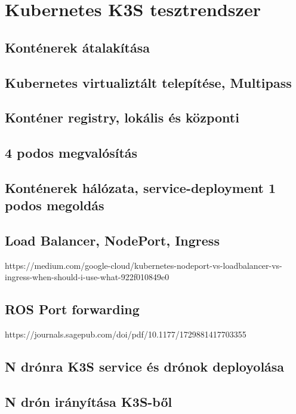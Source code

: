 
\chapter{Kubernetes K3S tesztrendszer}

\section{Konténerek átalakítása}

\section{Kubernetes virtualiztált telepítése, Multipass}

\section{Konténer registry, lokális és központi}

\section{4 podos megvalósítás}

\section{Konténerek hálózata, service-deployment 1 podos megoldás}

\section{Load Balancer, NodePort, Ingress}
https://medium.com/google-cloud/kubernetes-nodeport-vs-loadbalancer-vs-ingress-when-should-i-use-what-922f010849e0

\section{ROS Port forwarding}
https://journals.sagepub.com/doi/pdf/10.1177/1729881417703355

\section{N drónra K3S service és drónok deployolása}

\section{N drón irányítása K3S-ből}
